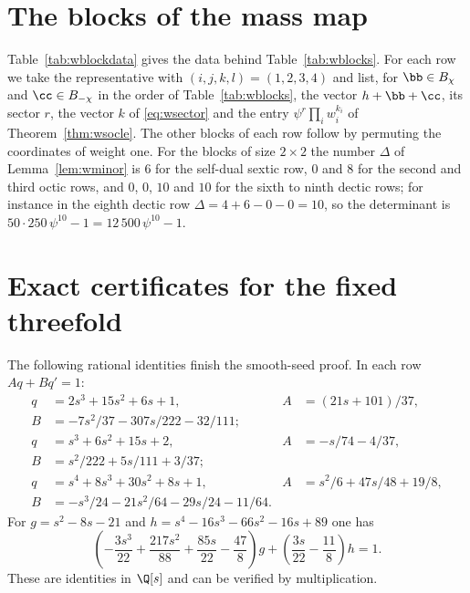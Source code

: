 \section{The blocks of the mass map}\label{app:wblocks}

Table~\ref{tab:wblockdata} gives the data behind Table~\ref{tab:wblocks}.
For each row we take the representative with $(i,j,k,l)=(1,2,3,4)$ and
list, for $\bb\in B_\chi$ and $\cc\in B_{-\chi}$ in the order of
Table~\ref{tab:wblocks}, the vector $h+\bb+\cc$, its sector $r$, the vector
$k$ of \eqref{eq:wsector} and the entry $\psi^r\prod_iw_i^{k_i}$ of
Theorem~\ref{thm:wsocle}. The other blocks of each row follow by permuting
the coordinates of weight one. For the blocks of size $2\times2$ the number
$\Delta$ of Lemma~\ref{lem:wminor} is $6$ for the self-dual sextic row, $0$
and $8$ for the second and third octic rows, and $0$, $0$, $10$ and $10$ for
the sixth to ninth dectic rows; for instance in the eighth dectic row
$\Delta=4+6-0-0=10$, so the determinant is
$50\cdot250\,\psi^{10}-1=12\,500\,\psi^{10}-1$.




\clearpage

\section{Exact certificates for the fixed threefold}\label{app:certificates}
The following rational identities finish the smooth-seed proof.
In each row $Aq+Bq'=1$:
\begin{align*}
q&=2s^3+15s^2+6s+1,&
A&=(21s+101)/37,\\
B&=-7s^2/37-307s/222-32/111;\\[2pt]
q&=s^3+6s^2+15s+2,&
A&=-s/74-4/37,\\
B&=s^2/222+5s/111+3/37;\\[2pt]
q&=s^4+8s^3+30s^2+8s+1,&
A&=s^2/6+47s/48+19/8,\\
B&=-s^3/24-21s^2/64-29s/24-11/64.
\end{align*}
For $g=s^2-8s-21$ and $h=s^4-16s^3-66s^2-16s+89$ one has
\[
 \left(-\frac{3s^3}{22}+\frac{217s^2}{88}
       +\frac{85s}{22}-\frac{47}{8}\right)g
 +\left(\frac{3s}{22}-\frac{11}{8}\right)h=1.
\]
These are identities in $\Q[s]$ and can be verified by multiplication.


